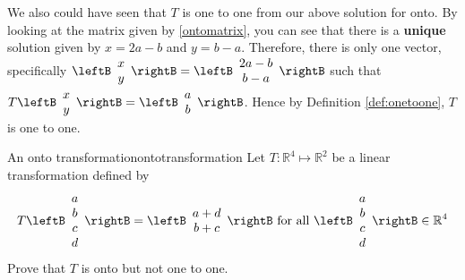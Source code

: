 \begin{solution}
We also could have seen that $T$ is one to one from our above solution for onto. By looking at the matrix given 
by \ref{ontomatrix}, you can see that there is a \textbf{unique} solution given
by $x=2a-b$ and $y=b-a$. Therefore, there
is only one vector, specifically 
$\leftB
\begin{array}{c}
x \\
y
\end{array}
\rightB
=
\leftB
\begin{array}{c}
2a-b\\
b-a
\end{array}
\rightB $ such that $T\leftB
\begin{array}{c}
x \\
y
\end{array}
\rightB =\leftB
\begin{array}{c}
a \\
b
\end{array}
\rightB $. Hence by Definition \ref{def:onetoone}, $T$ is one to one.
\end{solution}

\begin{example}{An onto transformation}{ontotransformation}
Let $T: \mathbb{R}^4 \mapsto \mathbb{R}^2$ be a linear transformation defined by
\[
T \leftB \begin{array}{c}
a \\
b \\
c \\
d
\end{array}
\rightB = 
\leftB \begin{array}{c}
a + d \\
b + c 
\end{array}
\rightB
\mbox{ for all } \leftB \begin{array}{c}
a \\
b \\
c \\
d
\end{array}
\rightB \in \mathbb{R}^4
\]
Prove that $T$ is onto but not one to one.
\end{example}

